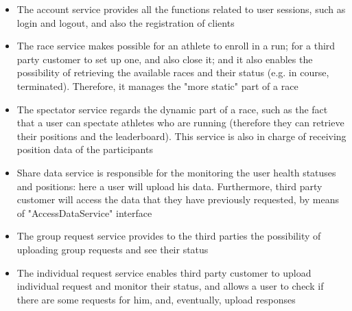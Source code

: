 \begin{itemize}
\item The account service provides all the functions related to user sessions, such as login and logout,
and also the registration of clients 
\item The race service makes possible for an athlete to enroll in a run; for a third party customer to set
up one, and also close it; and it also enables the possibility of retrieving the available races and their
status (e.g. in course, terminated). Therefore, it manages the "more static" part
of a race
\item The spectator service regards the dynamic part of a race, such as the fact that a user can spectate
athletes who are running (therefore they can retrieve their positions and the leaderboard). This
service is also in charge of receiving position data of the participants
\item Share data service is responsible for the monitoring the user health statuses and positions: here a
user will upload his data. Furthermore, third party customer will access the data that they have
previously requested, by means of "AccessDataService" interface
\item The group request service provides to the third parties the possibility of uploading group requests and see their status 
\item The individual request service enables third party customer to upload individual request and monitor their status, and allows a user to
check if there are some requests for him, and, eventually, upload responses 
\end{itemize}

